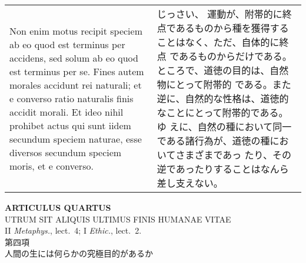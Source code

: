 \documentclass[10pt]{jsarticle} %
\begin{document}
\begin{longtable}{p{21em}p{21em}}
\\

Non enim motus recipit speciem ab eo quod
est terminus per accidens, sed solum ab eo quod est terminus per
se. Fines autem morales accidunt rei naturali; et e converso ratio
naturalis finis accidit morali. Et ideo nihil prohibet actus qui sunt
iidem secundum speciem naturae, esse diversos secundum speciem moris, et
e converso.

&

じっさい、 運動が、附帯的に終点であるものから種を獲得することはなく、ただ、自体的に終点
 であるものからだけである。ところで、道徳の目的は、自然物にとって附帯的
 である。また逆に、自然的な性格は、道徳的なことにとって附帯的である。ゆ
 えに、自然の種において同一である諸行為が、道徳の種においてさまざまであっ
 たり、その逆であったりすることはなんら差し支えない。



\end{longtable}
\newpage


\begin{center}
 {\Large {\bf ARTICULUS QUARTUS}}\\
 {\large UTRUM SIT ALIQUIS ULTIMUS FINIS HUMANAE VITAE}\\
 {\footnotesize II {\itshape Metaphys.}, lect.~4; I {\itshape Ethic.}, lect.~2.}\\
 {\Large 第四項\\人間の生には何らかの究極目的があるか}
\end{center}
\end{document}
